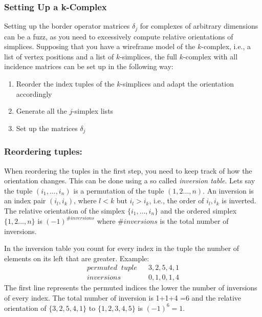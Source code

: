 \subsubsection{Setting Up a k-Complex}
Setting up the border operator matrices $\delta_j$ for complexes of arbitrary dimensions can be a fuzz, as you need to excessively compute relative orientations of simplices. Supposing that you have a wireframe model of the $k$-complex, i.e., a list of vertex positions and a list of $k$-simplices, the full $k$-complex  with all incidence matrices can be set up in the following way:
\begin{enumerate}
	\item Reorder the index tuples of the $k$-simplices and adapt the orientation accordingly
	\item Generate all the $j$-simplex lists
	\item Set up the matrices $\delta_j$
\end{enumerate}



\subsubsection{Reordering tuples: } When reordering the tuples in the first step, you need to keep track of how the orientation changes. This can be done using a so called \emph{inversion table}. Lets say the tuple $(i_1,...,i_n)$ is a permutation of the tuple $(1,2...,n)$. An inversion is an index pair $(i_l,i_k)$, where $l<k$ but $i_l >i_k$, i.e., the order of $i_l,i_k$ is inverted. The relative orientation of the simplex $\{i_1,...,i_n\}$ and the ordered simplex $\{1,2...,n\}$ is $(-1)^{\#inversions}$ where $\#inversions$ is the total number of inversions.

In the inversion table you count for every index in the tuple the number of elements on its left that are greater. Example: 
\begin{align*}
permuted \;\; tuple & &3,2,5,4,1 \\
inversions & & 0,1,0,1,4
\end{align*}
The first line represents the permuted indices the lower the number of inversions of every index. The total number of inversion is  1+1+4 =6 and the relative orientation of
$\{3,2,5,4,1\}$ to $\{1,2,3,4,5\}$ is $(-1)^6 = 1$.

